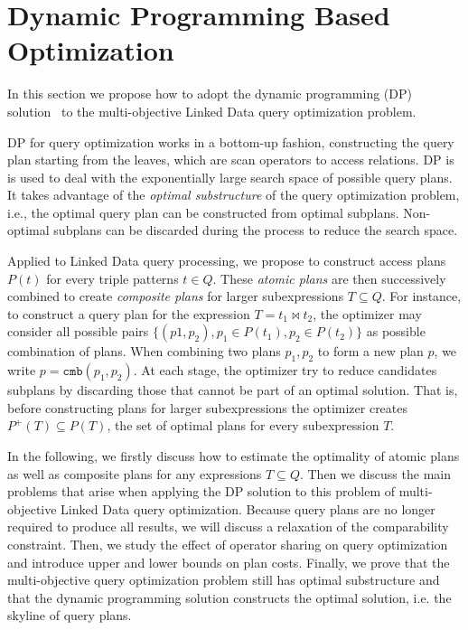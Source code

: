 \section{Dynamic Programming Based Optimization}
\label{sec:opt}
In this section we propose how to adopt the dynamic
programming (DP) solution~\cite{selinger_access_1979} to the 
multi-objective Linked Data query optimization problem. 

DP for query optimization works in a
bottom-up fashion, constructing the query plan starting from the
leaves, which are scan operators to access
relations. DP is is used to deal with the
exponentially large search space of possible query plans. It takes
advantage of the \emph{optimal substructure} of the query optimization
problem, i.e., the optimal query plan can be constructed from
optimal subplans. Non-optimal subplans can be
discarded during the process to reduce the search space.


Applied to Linked Data query processing, we propose to construct access plans $P(t)$ for every triple patterns $t \in Q$. These \emph{atomic plans} are then successively combined 
to create \emph{composite plans} for larger subexpressions $T \subseteq Q$. 
For instance, to construct a query plan for the expression $T=t_1\Join t_2$, the optimizer may consider all possible pairs $\{(p1,p_2), p_1 \in P(t_1),p_2 \in P(t_2)\}$ as possible combination of plans. When combining two plans $p_1,p_2$ to form a new plan $p$, we
write $p = \mathtt{cmb}(p_1,p_2)$. At each stage, the optimizer 
try to reduce candidates subplans by discarding those that cannot be part of an optimal solution. That is, before constructing plans for larger subexpressions the optimizer creates $P^+(T) \subseteq
P(T)$, the set of optimal plans for every subexpression $T$. 


In the following, we firstly discuss how to estimate the optimality of atomic plans as well as composite plans for any expressions $T \subseteq Q$. Then we discuss the main problems that arise when applying the DP solution to this problem of multi-objective Linked Data query optimization.  Because query plans are no longer required to produce all results, we will
discuss a relaxation of the comparability constraint. Then, we study the effect of operator sharing on query optimization and introduce upper and lower bounds on plan
costs. Finally, we prove that the multi-objective query optimization problem still has optimal
substructure and that the dynamic programming solution constructs the
optimal solution, i.e. the skyline of query plans.

